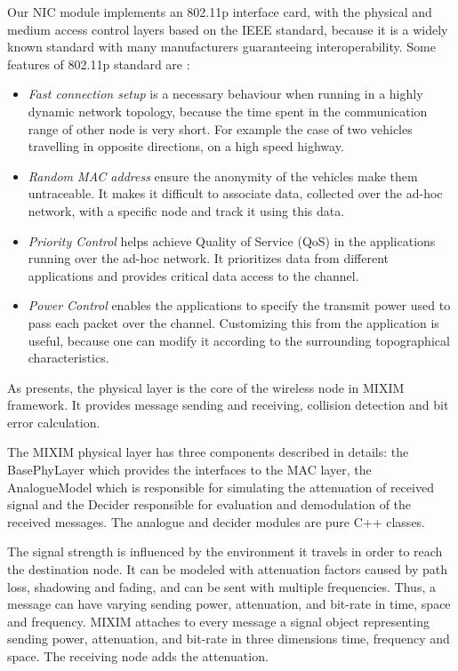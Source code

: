 Our NIC module implements an 802.11p interface card, with the physical and
medium access control layers based on the IEEE standard, because it is a widely
known standard with many manufacturers guaranteeing interoperability. Some
features of 802.11p standard are \cite{phule2012public}:
 
\begin{itemize}
  \item {\it Fast connection setup} is a necessary behaviour when running in a
  highly dynamic network topology, because the time spent in the communication
  range of other node is very short. For example the case of two vehicles
  travelling in opposite directions, on a high speed highway.
  \item {\it Random MAC address} ensure the anonymity of the vehicles make them
  untraceable. It makes it difficult to associate data, collected over the
  ad-hoc network, with a specific node and track it using this data.
  \item {\it Priority Control} helps achieve Quality of Service (QoS) in the
  applications running over the ad-hoc network. It prioritizes data from
  different applications and provides critical data access to the channel.
  \item{\it Power Control} enables the applications to specify the transmit
  power used to pass each packet over the channel. Customizing this from the
  application is useful, because one can modify it according to the surrounding
  topographical characteristics.
\end{itemize}

As \cite{Kopke} presents, the physical layer is the core of the wireless node in
MIXIM framework. It provides message sending and receiving, collision detection
and bit error calculation.

The MIXIM physical layer has three components described in details: the
BasePhyLayer which provides the interfaces to the MAC layer, the AnalogueModel
which is responsible for simulating the attenuation of received signal and the
Decider responsible for evaluation and demodulation of the received messages.
The analogue and decider modules are pure C++ classes.

The signal strength is influenced by the environment it travels in order to
reach the destination node. It can be modeled with attenuation factors caused by
path loss, shadowing and fading, and can be sent with multiple frequencies.
Thus, a message can have varying sending power, attenuation, and bit-rate in
time, space and frequency. MIXIM attaches to every message a signal object
representing sending power, attenuation, and bit-rate in three dimensions time,
frequency and space. The receiving node adds the attenuation.

